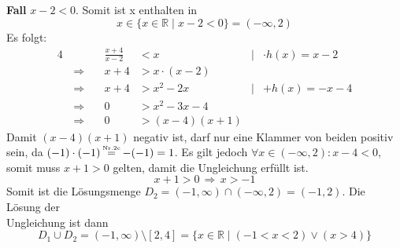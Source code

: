 \documentclass[a4paper,graphics,12pt]{article}
\newcommand{\up}[2]{\mathrel{\overset{\makebox[0pt]{\mbox{\normalfont\tiny #2}}}{#1}}}
\begin{document}
\textbf{Fall} $x-2 < 0$. Somit ist x enthalten in
$$ x \in \{x \in \mathbb{R} \mid x-2 < 0\} = (-\infty, 2)$$
Es folgt:
\begin{alignat*}{4}
    &                   &\frac{x+4}{x-2} &<x &|& \cdot h(x)=x-2 \\[1pt]
    &\,\Longrightarrow\quad     &x+4 &> x\cdot (x-2) && \\[1pt]
    &\,\Longrightarrow\         &x+4 &> x^2-2x \qquad&|& +h(x)=-x-4 \\[1pt]
    &\,\Longrightarrow\         &0 &> x^2-3x-4 && \\[1pt]
    &\,\Longrightarrow\         &0 &> (x-4)(x+1) &&
\end{alignat*}
Damit $(x-4)(x+1)$ negativ ist, darf nur eine Klammer von beiden positiv sein, da
$(-1)\cdot (-1) \up{\ =\ }{Nr.2c} -(-1) = 1$.
Es gilt jedoch $\forall x \in (-\infty, 2)\colon x-4 < 0$, somit muss $x+1 > 0$ gelten,
damit die Ungleichung erfüllt ist.
$$x+1 > 0 \,\Longrightarrow\, x>-1$$
Somit ist die Lösungsmenge $D_2 = (-1,\infty) \cap (-\infty,2) = (-1,2)$. Die Lösung
der\\
Ungleichung ist dann
$$D_1 \cup D_2 = (-1,\infty) \setminus [2,4] = \{x \in \mathbb{R} \mid (-1 < x < 2) \lor (x > 4)\}$$
\end{document}
